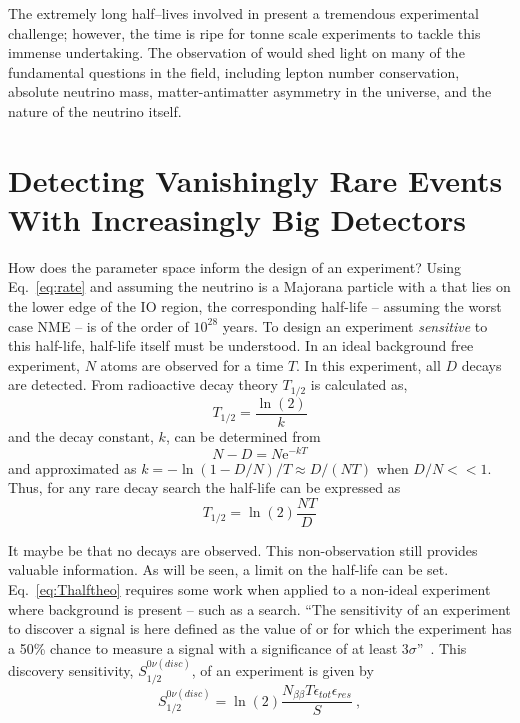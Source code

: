 The extremely long half--lives involved in \novbb{} present a tremendous experimental challenge; however, the time is ripe for tonne scale experiments to tackle this immense undertaking. The observation of \novbb{} would shed light on many of the fundamental questions in the field, including lepton number conservation, absolute neutrino mass, matter-antimatter asymmetry in the universe, and the nature of the neutrino itself. 

\section{Detecting Vanishingly Rare Events With Increasingly Big Detectors}

How does the \mbb{} parameter space inform the design of an experiment? Using Eq.~\ref{eq:rate} and assuming the neutrino is a Majorana particle with a \mbb{} that lies on the lower edge of the IO region, the corresponding half-life -- assuming the worst case NME -- is of the order of $10^{28}$ years. To design an experiment \textit{sensitive} to this half-life, half-life itself must be understood. In an ideal background free experiment, $N$ atoms are observed for a time $T$. In this experiment, all $D$ decays are detected. From radioactive decay theory $T_{1/2}$ is calculated as,
\begin{equation}
	T_{1/2} = \frac{\ln(2)}{k} 
\end{equation}
and the decay constant, $k$, can be determined from
\begin{equation}
	N - D = N\text{e}^{-kT}
\end{equation}
and approximated as $k = -\ln(1 - D/N)/T \approx D/(NT)$ when $D/N << 1$. Thus, for any rare decay search the half-life can be expressed as
\begin{equation}
	T_{1/2} = \ln(2)\frac{NT}{D} 
	\label{eq:Thalftheo}
\end{equation}

It maybe be that no decays are observed. This non-observation still provides valuable information. As will be seen, a limit on the half-life can be set. Eq.~\ref{eq:Thalftheo} requires some work when applied to a non-ideal experiment where background is present -- such as a \novbb{} search.  ``The sensitivity of an experiment to discover a signal is here defined as the value of \Thalf{} or \mbb{} for which the experiment has a 50\% chance to measure a signal with a significance of at least 3$\sigma$''~\cite{disc_prob0vbb}. This discovery sensitivity, $S^{0\nu(disc)}_{1/2}$, of an \novbb{} experiment is given by
\begin{equation}
	S^{0\nu(disc)}_{1/2} = \ln(2)\frac{N_{\beta\beta}T\epsilon_{tot}\epsilon_{res}}{S}~,
\label{eq:Thalfexp}
\end{equation}

